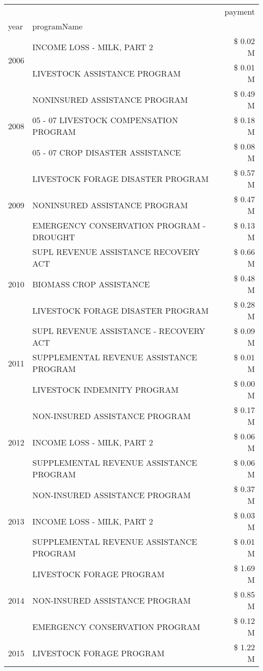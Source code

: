 \begin{tabular}{llr}
\toprule
 &  & payment \\
year & programName &  \\
\midrule
\multirow[t]{2}{*}{2006} & INCOME LOSS - MILK, PART 2 & \$ 0.02 M \\
 & LIVESTOCK ASSISTANCE PROGRAM & \$ 0.01 M \\
\cline{1-3}
\multirow[t]{3}{*}{2008} & NONINSURED ASSISTANCE PROGRAM & \$ 0.49 M \\
 & 05 - 07 LIVESTOCK COMPENSATION PROGRAM & \$ 0.18 M \\
 & 05 - 07 CROP DISASTER ASSISTANCE & \$ 0.08 M \\
\cline{1-3}
\multirow[t]{3}{*}{2009} & LIVESTOCK FORAGE DISASTER  PROGRAM & \$ 0.57 M \\
 & NONINSURED ASSISTANCE PROGRAM & \$ 0.47 M \\
 & EMERGENCY CONSERVATION PROGRAM - DROUGHT & \$ 0.13 M \\
\cline{1-3}
\multirow[t]{3}{*}{2010} & SUPL REVENUE ASSISTANCE RECOVERY ACT & \$ 0.66 M \\
 & BIOMASS CROP ASSISTANCE & \$ 0.48 M \\
 & LIVESTOCK FORAGE DISASTER  PROGRAM & \$ 0.28 M \\
\cline{1-3}
\multirow[t]{3}{*}{2011} & SUPL REVENUE ASSISTANCE - RECOVERY ACT & \$ 0.09 M \\
 & SUPPLEMENTAL REVENUE ASSISTANCE PROGRAM & \$ 0.01 M \\
 & LIVESTOCK INDEMNITY PROGRAM & \$ 0.00 M \\
\cline{1-3}
\multirow[t]{3}{*}{2012} & NON-INSURED ASSISTANCE PROGRAM & \$ 0.17 M \\
 & INCOME LOSS - MILK, PART 2 & \$ 0.06 M \\
 & SUPPLEMENTAL REVENUE ASSISTANCE PROGRAM & \$ 0.06 M \\
\cline{1-3}
\multirow[t]{3}{*}{2013} & NON-INSURED ASSISTANCE PROGRAM & \$ 0.37 M \\
 & INCOME LOSS - MILK, PART 2 & \$ 0.03 M \\
 & SUPPLEMENTAL REVENUE ASSISTANCE PROGRAM & \$ 0.01 M \\
\cline{1-3}
\multirow[t]{3}{*}{2014} & LIVESTOCK FORAGE PROGRAM & \$ 1.69 M \\
 & NON-INSURED ASSISTANCE PROGRAM & \$ 0.85 M \\
 & EMERGENCY CONSERVATION PROGRAM & \$ 0.12 M \\
\cline{1-3}
\multirow[t]{3}{*}{2015} & LIVESTOCK FORAGE PROGRAM & \$ 1.22 M \\

\end{tabular}
